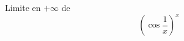 Limite en $+\infty$ de
\begin{displaymath}
 \left( \cos \dfrac{1}{x}\right)^{x} 
\end{displaymath}
\bigskip
